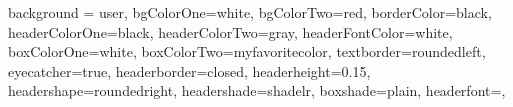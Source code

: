 \documentclass[landscape,paperwidth=43truein,paperheight=33.1truein,fontscale=0.3]{baposter}
\begin{document}


\begin{poster}
{%
background = user,
 bgColorOne=white,
  bgColorTwo=red,
  borderColor=black,
  headerColorOne=black,
  headerColorTwo=gray,
  headerFontColor=white,
  boxColorOne=white,
  boxColorTwo=myfavoritecolor,
  textborder=roundedleft,
  eyecatcher=true,
  headerborder=closed,
  headerheight=0.15\textheight,
  headershape=roundedright,
  headershade=shadelr,
  boxshade=plain,
  headerfont=\Large\textrm,
}
{%
}
\end{poster}
\end{document}
